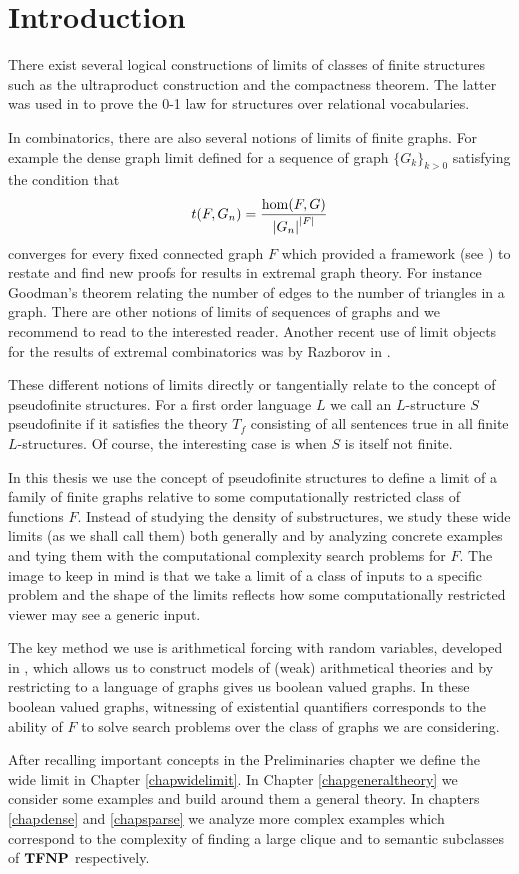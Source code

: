 \chapter*{Introduction}

There exist several logical constructions of limits of classes of finite structures such as the ultraproduct construction and the compactness theorem. The latter was used in \cite{Fagin1976} to prove the 0-1 law for structures over relational vocabularies.

In combinatorics, there are also several notions of limits of finite graphs. For example the dense graph limit defined for a sequence of graph $\{G_k\}_{k>0}$ satisfying the condition that
\[t(F,G_n)=\frac{\hom(F,G)}{\left|{G_n}\right|^{\left|{F}\right|}}\]
converges for every fixed connected graph $F$ which provided a framework (see \cite{lovasz2006limits}) to restate and find new proofs for results in extremal graph theory. For instance Goodman's theorem relating the number of edges to the number of triangles in a graph. There are other notions of limits of sequences of graphs and we recommend to read \cite{Nesetril2013} to the interested reader. Another recent use of limit objects for the results of extremal combinatorics was by Razborov in \cite{razborov2007flag}.

These different notions of limits directly or tangentially relate to the concept of pseudofinite structures. For a first order language $L$ we call an $L$-structure $S$ pseudofinite if it satisfies the theory $T_f$ consisting of all sentences true in all finite $L$-structures. Of course, the interesting case is when $S$ is itself not finite.

In this thesis we use the concept of pseudofinite structures to define a limit of a family of finite graphs relative to some computationally restricted class of functions $F$. Instead of studying the density of substructures, we study these wide limits (as we shall call them) both generally and by analyzing concrete examples and tying them with the computational complexity search problems for $F$. The image to keep in mind is that we take a limit of a class of inputs to a specific problem and the shape of the limits reflects how some computationally restricted viewer may see a generic input.

The key method we use is arithmetical forcing with random variables, developed in \cite{krajicek2010forcing}, which allows us to construct models of (weak) arithmetical theories and by restricting to a language of graphs gives us boolean valued graphs. In these boolean valued graphs, witnessing of existential quantifiers corresponds to the ability of $F$ to solve search problems over the class of graphs we are considering.

After recalling important concepts in the Preliminaries chapter we define the wide limit in Chapter \ref{chapwidelimit}. In Chapter \ref{chapgeneraltheory} we consider some examples and build around them a general theory. In chapters \ref{chapdense} and \ref{chapsparse} we analyze more complex examples which correspond to the complexity of finding a large clique and to semantic subclasses of $\textbf{TFNP}$ respectively. 
